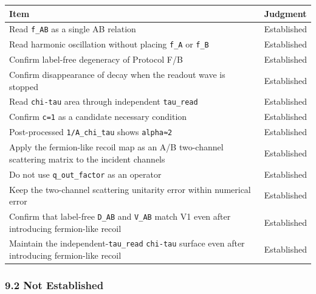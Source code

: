 \documentclass[
]{article}
\newcounter{none} %
\begin{document}
{\def\LTcaptype{none} %
\begin{longtable}[]{@{}
  >{\raggedright\arraybackslash}p{}
  >{\raggedright\arraybackslash}p{}@{}}
\toprule\noalign{}
\begin{minipage}[b]{\linewidth}\raggedright
Item
\end{minipage} & \begin{minipage}[b]{\linewidth}\raggedright
Judgment
\end{minipage} \\
\midrule\noalign{}
\endhead
\bottomrule\noalign{}
\endlastfoot
Read \texttt{f\_AB} as a single AB relation & Established \\
Read harmonic oscillation without placing \texttt{f\_A} or \texttt{f\_B}
& Established \\
Confirm label-free degeneracy of Protocol F/B & Established \\
Confirm disappearance of decay when the readout wave is stopped &
Established \\
Read \texttt{chi-tau} area through independent \texttt{tau\_read} &
Established \\
Confirm \texttt{c=1} as a candidate necessary condition & Established \\
Post-processed \texttt{1/A\_chi\_tau} shows \texttt{alpha≈2} &
Established \\
Apply the fermion-like recoil map as an A/B two-channel scattering
matrix to the incident channels & Established \\
Do not use \texttt{q\_out\_factor} as an operator & Established \\
Keep the two-channel scattering unitarity error within numerical error &
Established \\
Confirm that label-free \texttt{D\_AB} and \texttt{V\_AB} match V1 even
after introducing fermion-like recoil & Established \\
Maintain the independent-\texttt{tau\_read} \texttt{chi-tau} surface
even after introducing fermion-like recoil & Established \\
\end{longtable}
}

\subsubsection{9.2 Not Established}\label{not-established}
\end{document}

